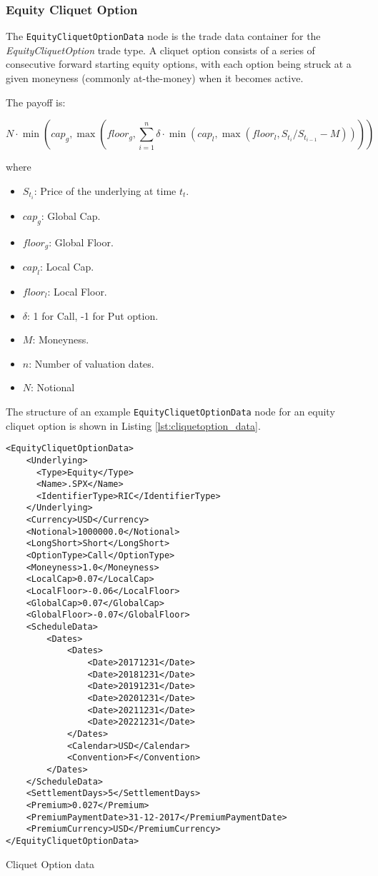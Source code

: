 \subsubsection{Equity Cliquet Option}
\label{SubSectionEqCliquetOption}

The \lstinline!EquityCliquetOptionData! node is the trade data container for the \emph{EquityCliquetOption}  trade type. A cliquet option consists of a series of consecutive forward starting equity options, with each option being struck at a given moneyness (commonly at-the-money) when it becomes active.

The payoff is:

$$
N \cdot \min\left( cap_{g}, \max \left(  floor_{g}, \sum_{i=1}^{n} \delta \cdot \min \left( cap_{l}, \max \left( floor_{l}, S_{t_{i}} / S_{t_{i-1}} - M \right) \right) \right) \right)
$$

where
\begin{itemize}
\item $S_{t_i}$: Price of the underlying at time $t_{t}$.
\item $cap_{g}$: Global Cap.
\item $floor_{g}$: Global Floor.
\item $cap_{l}$: Local Cap.
\item $floor_{l}$: Local Floor.
\item $\delta$: 1 for Call, -1 for Put option.
\item $M$: Moneyness.
\item $n$: Number of valuation dates.
\item $N$: Notional
\end{itemize}


The structure of an example \lstinline!EquityCliquetOptionData! node for an equity cliquet option is shown in Listing \ref{lst:cliquetoption_data}.

\begin{listing}[H]
	\begin{verbatim}
<EquityCliquetOptionData>
    <Underlying>
      <Type>Equity</Type>
      <Name>.SPX</Name>
      <IdentifierType>RIC</IdentifierType>
    </Underlying>
    <Currency>USD</Currency>
    <Notional>1000000.0</Notional>
    <LongShort>Short</LongShort>
    <OptionType>Call</OptionType>
    <Moneyness>1.0</Moneyness>
    <LocalCap>0.07</LocalCap>
    <LocalFloor>-0.06</LocalFloor>
    <GlobalCap>0.07</GlobalCap>
    <GlobalFloor>-0.07</GlobalFloor>
    <ScheduleData>
        <Dates>
            <Dates>
                <Date>20171231</Date>
                <Date>20181231</Date>
                <Date>20191231</Date>
                <Date>20201231</Date>
                <Date>20211231</Date>
                <Date>20221231</Date>
            </Dates>
            <Calendar>USD</Calendar>
            <Convention>F</Convention>
        </Dates>    
    </ScheduleData>
    <SettlementDays>5</SettlementDays>
    <Premium>0.027</Premium>
    <PremiumPaymentDate>31-12-2017</PremiumPaymentDate>
    <PremiumCurrency>USD</PremiumCurrency>
</EquityCliquetOptionData>
    \end{verbatim}
    \caption{Cliquet Option data}
	\label{lst:cliquetoption_data}
\end{listing}


